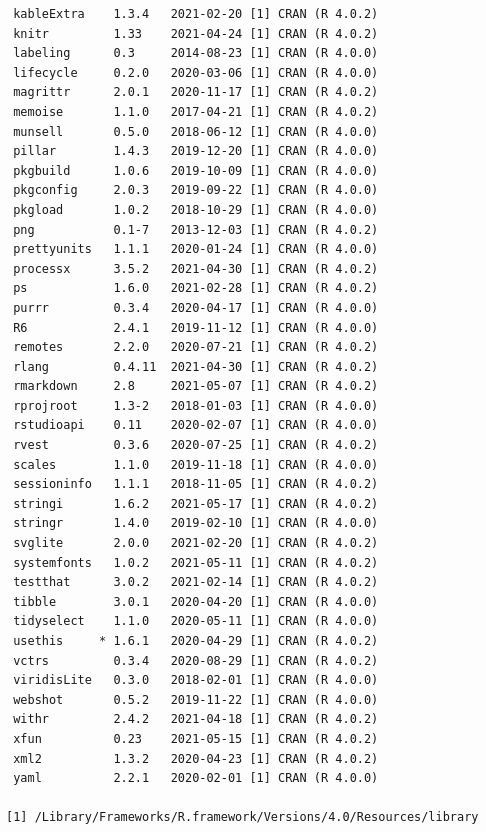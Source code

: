 \documentclass [11pt, proquest] {uwthesis}[2015/03/03]
\begin{document}
\begin{verbatim}
 kableExtra    1.3.4   2021-02-20 [1] CRAN (R 4.0.2)                       
 knitr         1.33    2021-04-24 [1] CRAN (R 4.0.2)                       
 labeling      0.3     2014-08-23 [1] CRAN (R 4.0.0)                       
 lifecycle     0.2.0   2020-03-06 [1] CRAN (R 4.0.0)                       
 magrittr      2.0.1   2020-11-17 [1] CRAN (R 4.0.2)                       
 memoise       1.1.0   2017-04-21 [1] CRAN (R 4.0.2)                       
 munsell       0.5.0   2018-06-12 [1] CRAN (R 4.0.0)                       
 pillar        1.4.3   2019-12-20 [1] CRAN (R 4.0.0)                       
 pkgbuild      1.0.6   2019-10-09 [1] CRAN (R 4.0.0)                       
 pkgconfig     2.0.3   2019-09-22 [1] CRAN (R 4.0.0)                       
 pkgload       1.0.2   2018-10-29 [1] CRAN (R 4.0.0)                       
 png           0.1-7   2013-12-03 [1] CRAN (R 4.0.2)                       
 prettyunits   1.1.1   2020-01-24 [1] CRAN (R 4.0.0)                       
 processx      3.5.2   2021-04-30 [1] CRAN (R 4.0.2)                       
 ps            1.6.0   2021-02-28 [1] CRAN (R 4.0.2)                       
 purrr         0.3.4   2020-04-17 [1] CRAN (R 4.0.0)                       
 R6            2.4.1   2019-11-12 [1] CRAN (R 4.0.0)                       
 remotes       2.2.0   2020-07-21 [1] CRAN (R 4.0.2)                       
 rlang         0.4.11  2021-04-30 [1] CRAN (R 4.0.2)                       
 rmarkdown     2.8     2021-05-07 [1] CRAN (R 4.0.2)                       
 rprojroot     1.3-2   2018-01-03 [1] CRAN (R 4.0.0)                       
 rstudioapi    0.11    2020-02-07 [1] CRAN (R 4.0.0)                       
 rvest         0.3.6   2020-07-25 [1] CRAN (R 4.0.2)                       
 scales        1.1.0   2019-11-18 [1] CRAN (R 4.0.0)                       
 sessioninfo   1.1.1   2018-11-05 [1] CRAN (R 4.0.2)                       
 stringi       1.6.2   2021-05-17 [1] CRAN (R 4.0.2)                       
 stringr       1.4.0   2019-02-10 [1] CRAN (R 4.0.0)                       
 svglite       2.0.0   2021-02-20 [1] CRAN (R 4.0.2)                       
 systemfonts   1.0.2   2021-05-11 [1] CRAN (R 4.0.2)                       
 testthat      3.0.2   2021-02-14 [1] CRAN (R 4.0.2)                       
 tibble        3.0.1   2020-04-20 [1] CRAN (R 4.0.0)                       
 tidyselect    1.1.0   2020-05-11 [1] CRAN (R 4.0.0)                       
 usethis     * 1.6.1   2020-04-29 [1] CRAN (R 4.0.2)                       
 vctrs         0.3.4   2020-08-29 [1] CRAN (R 4.0.2)                       
 viridisLite   0.3.0   2018-02-01 [1] CRAN (R 4.0.0)                       
 webshot       0.5.2   2019-11-22 [1] CRAN (R 4.0.0)                       
 withr         2.4.2   2021-04-18 [1] CRAN (R 4.0.2)                       
 xfun          0.23    2021-05-15 [1] CRAN (R 4.0.2)                       
 xml2          1.3.2   2020-04-23 [1] CRAN (R 4.0.2)                       
 yaml          2.2.1   2020-02-01 [1] CRAN (R 4.0.0)                       

[1] /Library/Frameworks/R.framework/Versions/4.0/Resources/library
\end{verbatim}
\backmatter
\end{document}
